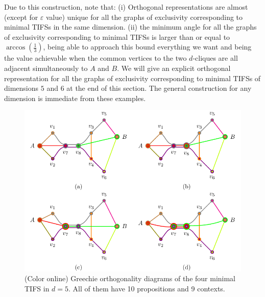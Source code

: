 \documentclass[%
 twocolumn,
 groupedaddress,
 showpacs,
 showkeys,
 preprintnumbers,
 amsmath,amssymb,
 aps,
 pra,
 longbibliography,
 floatfix,
 ]{revtex4-1}
\begin{document}

Due to this construction, note that: (i) Orthogonal representations are almost (except for $ \varepsilon $ value) unique for all the graphs of exclusivity corresponding to minimal TIFSs in the same dimension. (ii) the minimum angle for all the graphs of exclusivity corresponding to minimal TIFSs is larger than or equal to $ \arccos \left(\frac{1}{3}\right)$, being able to approach this bound everything we want and being the value achievable when the common vertices to the two $d$-cliques are all adjacent simultaneously to $ A $ and $ B $. We will give an explicit orthogonal representation for all the graphs of exclusivity corresponding to minimal TIFSs of dimensions $ 5 $ and $ 6 $ at the end of this section. The general construction for any dimension is immediate from these examples.


\begin{figure}
	\begin{center}
		\includegraphics[width=\columnwidth]{2018-minimalYIYS_pra_15REVISEDJR-Fig5.pdf}
	\end{center}
	\caption{\label{fig:d5}
		(Color online)
		Greechie orthogonality diagrams of the four minimal
		TIFS in $d=5$. All of them have 10 propositions and 9 contexts.
		}
\end{figure}

\end{document}

